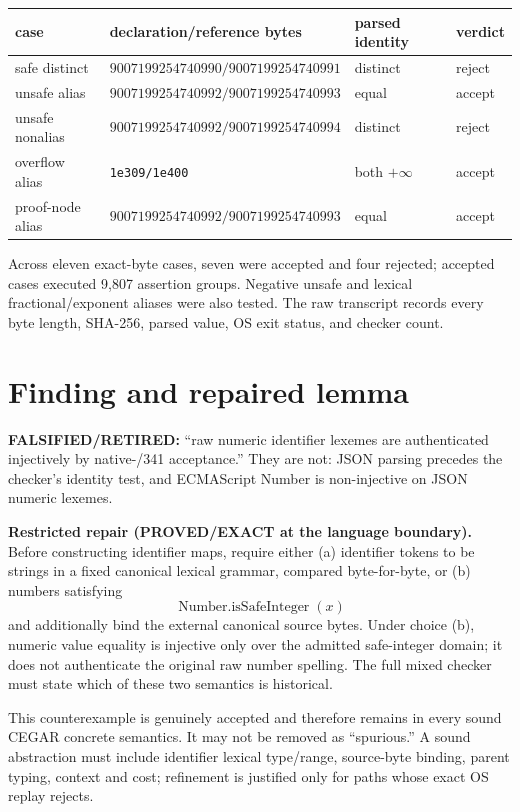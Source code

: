 \documentclass[11pt]{article}
\begin{document}
\begin{center}
\begin{tabular}{llll}
\toprule
case & declaration/reference bytes & parsed identity & verdict\\
\midrule
safe distinct & $9007199254740990/9007199254740991$ & distinct & reject\\
unsafe alias & $9007199254740992/9007199254740993$ & equal & accept\\
unsafe nonalias & $9007199254740992/9007199254740994$ & distinct & reject\\
overflow alias & \texttt{1e309/1e400} & both $+\infty$ & accept\\
proof-node alias & $9007199254740992/9007199254740993$ & equal & accept\\
\bottomrule
\end{tabular}
\end{center}

Across eleven exact-byte cases, seven were accepted and four rejected; accepted cases executed 9,807 assertion groups.  Negative unsafe and lexical fractional/exponent aliases were also tested.  The raw transcript records every byte length, SHA-256, parsed value, OS exit status, and checker count.

\section{Finding and repaired lemma}
\textbf{FALSIFIED/RETIRED:} ``raw numeric identifier lexemes are authenticated injectively by native-/341 acceptance.''  They are not: JSON parsing precedes the checker's identity test, and ECMAScript Number is non-injective on JSON numeric lexemes.

\textbf{Restricted repair (PROVED/EXACT at the language boundary).}  Before constructing identifier maps, require either (a) identifier tokens to be strings in a fixed canonical lexical grammar, compared byte-for-byte, or (b) numbers satisfying
\[
  \operatorname{Number.isSafeInteger}(x)
\]
and additionally bind the external canonical source bytes.  Under choice (b), numeric value equality is injective only over the admitted safe-integer domain; it does not authenticate the original raw number spelling.  The full mixed checker must state which of these two semantics is historical.

This counterexample is genuinely accepted and therefore remains in every sound CEGAR concrete semantics.  It may not be removed as ``spurious.''  A sound abstraction must include identifier lexical type/range, source-byte binding, parent typing, context and cost; refinement is justified only for paths whose exact OS replay rejects.
\end{document}
